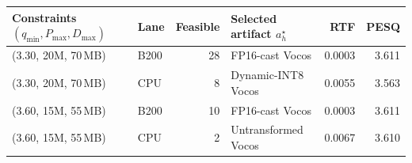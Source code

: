 \begin{tabular*}{\linewidth}{@{\extracolsep{\fill}}llrlrr@{}}
  \toprule
  Constraints $(q_{\min}, P_{\max}, D_{\max})$ & Lane & Feasible & Selected artifact $a_h^\star$ & RTF & PESQ \\
  \midrule
  (3.30, 20M, 70\,MB) & B200 & 28 & FP16-cast Vocos & 0.0003 & 3.611 \\
  (3.30, 20M, 70\,MB) & CPU & 8 & Dynamic-INT8 Vocos & 0.0055 & 3.563 \\
  (3.60, 15M, 55\,MB) & B200 & 10 & FP16-cast Vocos & 0.0003 & 3.611 \\
  (3.60, 15M, 55\,MB) & CPU & 2 & Untransformed Vocos & 0.0067 & 3.610 \\
  \bottomrule
\end{tabular*}
